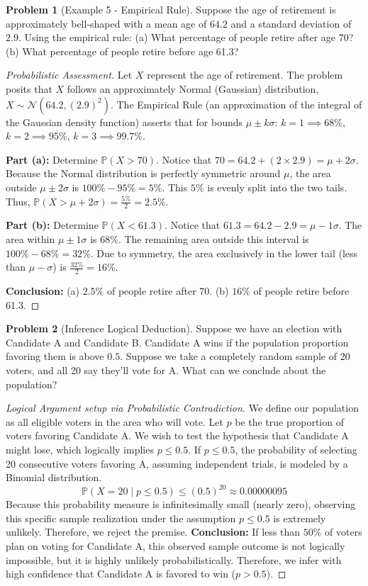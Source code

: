 \documentclass[11pt]{article}
\theoremstyle{definition}
\newtheorem{problem}{Problem}
\theoremstyle{remark}
\newcommand{\Prob}{\mathbb{P}}
\begin{document}
\begin{problem}[Example 5 - Empirical Rule]
Suppose the age of retirement is approximately bell-shaped with a mean age of $64.2$ and a standard deviation of $2.9$. Using the empirical rule:
(a) What percentage of people retire after age 70? 
(b) What percentage of people retire before age 61.3?
\end{problem}
\begin{proof}[Probabilistic Assessment]
Let $X$ represent the age of retirement. The problem posits that $X$ follows an approximately Normal (Gaussian) distribution, $X \sim \mathcal{N}(64.2, (2.9)^2)$. The Empirical Rule (an approximation of the integral of the Gaussian density function) asserts that for bounds $\mu \pm k\sigma$:
$k=1 \implies 68\%$, $k=2 \implies 95\%$, $k=3 \implies 99.7\%$.

\textbf{Part (a):} Determine $\Prob(X > 70)$.
Notice that $70 = 64.2 + (2 \times 2.9) = \mu + 2\sigma$.
Because the Normal distribution is perfectly symmetric around $\mu$, the area outside $\mu \pm 2\sigma$ is $100\% - 95\% = 5\%$.
This $5\%$ is evenly split into the two tails. 
Thus, $\Prob(X > \mu + 2\sigma) = \frac{5\%}{2} = 2.5\%$.

\textbf{Part (b):} Determine $\Prob(X < 61.3)$.
Notice that $61.3 = 64.2 - 2.9 = \mu - 1\sigma$.
The area within $\mu \pm 1\sigma$ is $68\%$. The remaining area outside this interval is $100\% - 68\% = 32\%$.
Due to symmetry, the area exclusively in the lower tail (less than $\mu - \sigma$) is $\frac{32\%}{2} = 16\%$.

\textbf{Conclusion:} (a) $2.5\%$ of people retire after 70. (b) $16\%$ of people retire before 61.3.
\end{proof}

\begin{problem}[Inference Logical Deduction]
Suppose we have an election with Candidate A and Candidate B. Candidate A wins if the population proportion favoring them is above $0.5$. Suppose we take a completely random sample of 20 voters, and all 20 say they'll vote for A. What can we conclude about the population?
\end{problem}
\begin{proof}[Logical Argument setup via Probabilistic Contradiction]
We define our population as all eligible voters in the area who will vote. Let $p$ be the true proportion of voters favoring Candidate A. We wish to test the hypothesis that Candidate A might lose, which logically implies $p \le 0.5$.
If $p \le 0.5$, the probability of selecting 20 consecutive voters favoring A, assuming independent trials, is modeled by a Binomial distribution.
\[ \Prob(X = 20 \mid p \le 0.5) \le (0.5)^{20} \approx 0.00000095 \]
Because this probability measure is infinitesimally small (nearly zero), observing this specific sample realization under the assumption $p \le 0.5$ is extremely unlikely. Therefore, we reject the premise.
\textbf{Conclusion:} If less than $50\%$ of voters plan on voting for Candidate A, this observed sample outcome is not logically impossible, but it is highly unlikely probabilistically. Therefore, we infer with high confidence that Candidate A is favored to win ($p > 0.5$).
\end{proof}
\end{document}
